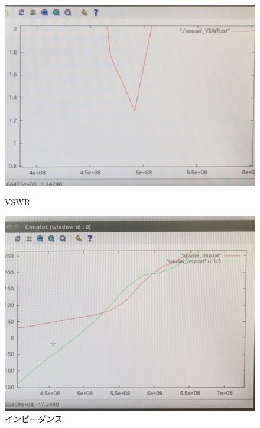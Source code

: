\documentclass[dvipdfmx,autodetect-engine,titlepage]{jsarticle}
\begin{document}
\begin{figure}[h]
  \centering
  \begin{minipage}[b]{0.45\linewidth}
  \begin{center}
    \includegraphics[keepaspectratio,scale=0.4]{pic11.png}
    \end{center}
    \caption{VSWR}
  \end{minipage}
  \begin{minipage}[b]{0.45\linewidth}
  \begin{center}
    \includegraphics[keepaspectratio,scale=0.4]{pic12.png}
    \end{center}
    \caption{インピーダンス}
  \end{minipage}
\end{figure}
\newpage
\end{document}

